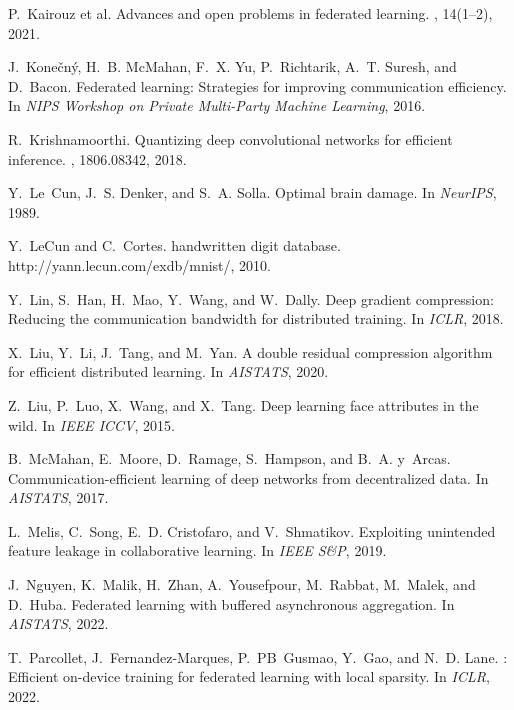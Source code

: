 \documentclass[11pt]{article}
\begin{document}
\begin{thebibliography}{10}
\begin{small}
P.~{Kairouz et al.}
\newblock Advances and open problems in federated learning.
, 14(1–2), 2021.

J.~Konečný, H.~B. McMahan, F.~X. Yu, P.~Richtarik, A.~T. Suresh, and
  D.~Bacon.
\newblock Federated learning: Strategies for improving communication
  efficiency.
\newblock In {\em NIPS Workshop on Private Multi-Party Machine Learning}, 2016.

R.~Krishnamoorthi.
\newblock Quantizing deep convolutional networks for efficient inference.
, 1806.08342, 2018.

Y.~Le~Cun, J.~S. Denker, and S.~A. Solla.
\newblock Optimal brain damage.
\newblock In {\em NeurIPS}, 1989.

Y.~LeCun and C.~Cortes.
 handwritten digit database.
\newblock http://yann.lecun.com/exdb/mnist/, 2010.

Y.~Lin, S.~Han, H.~Mao, Y.~Wang, and W.~Dally.
\newblock Deep gradient compression: Reducing the communication bandwidth for
  distributed training.
\newblock In {\em ICLR}, 2018.

X.~Liu, Y.~Li, J.~Tang, and M.~Yan.
\newblock A double residual compression algorithm for efficient distributed
  learning.
\newblock In {\em AISTATS}, 2020.

Z.~Liu, P.~Luo, X.~Wang, and X.~Tang.
\newblock Deep learning face attributes in the wild.
\newblock In {\em {IEEE} ICCV}, 2015.

B.~McMahan, E.~Moore, D.~Ramage, S.~Hampson, and B.~A. y~Arcas.
\newblock Communication-efficient learning of deep networks from decentralized
  data.
\newblock In {\em AISTATS}, 2017.

L.~Melis, C.~Song, E.~D. Cristofaro, and V.~Shmatikov.
\newblock Exploiting unintended feature leakage in collaborative learning.
\newblock In {\em {IEEE} S\&P}, 2019.

J.~Nguyen, K.~Malik, H.~Zhan, A.~Yousefpour, M.~Rabbat, M.~Malek, and D.~Huba.
\newblock Federated learning with buffered asynchronous aggregation.
\newblock In {\em AISTATS}, 2022.

T.~Parcollet, J.~Fernandez-Marques, P.~PB~Gusmao, Y.~Gao, and N.~D. Lane.
: Efficient on-device training for federated learning with
  local sparsity.
\newblock In {\em ICLR}, 2022.


\end{small}
\end{thebibliography}
\end{document}
